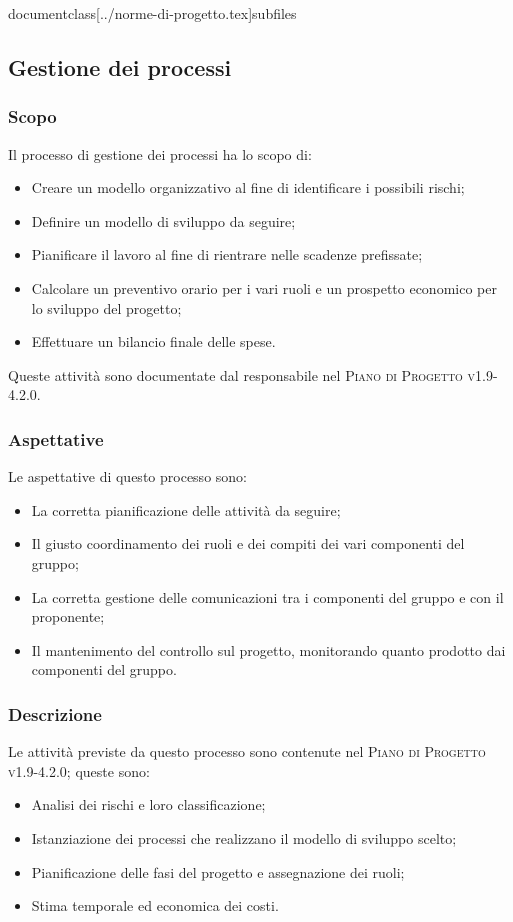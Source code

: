documentclass[../norme-di-progetto.tex]{subfiles}


\subsection{Gestione dei processi}
\subsubsection{Scopo}
Il processo di gestione dei processi ha lo scopo di:
\begin{itemize}
  \item Creare un modello organizzativo al fine di identificare i possibili rischi;
  \item Definire un modello di sviluppo da seguire;
  \item Pianificare il lavoro al fine di rientrare nelle scadenze prefissate;
  \item Calcolare un preventivo orario per i vari ruoli e un prospetto economico per lo sviluppo del progetto;
  \item Effettuare un bilancio finale delle spese.
\end{itemize}
Queste attività sono documentate dal responsabile nel \textsc{Piano di Progetto v1.9-4.2.0}.

\subsubsection{Aspettative}
Le aspettative di questo processo sono:
\begin{itemize}
  \item La corretta pianificazione delle attività da seguire;
  \item Il giusto coordinamento dei ruoli e dei compiti dei vari componenti del gruppo;
  \item La corretta gestione delle comunicazioni tra i componenti del gruppo e con il proponente;
  \item Il mantenimento del controllo sul progetto, monitorando quanto prodotto dai componenti del gruppo.
\end{itemize}

\subsubsection{Descrizione}
Le attività previste da questo processo sono contenute nel \textsc{Piano di Progetto v1.9-4.2.0}; queste sono:
\begin{itemize}
  \item Analisi dei rischi e loro classificazione;
  \item Istanziazione dei processi che realizzano il modello di sviluppo scelto;
  \item Pianificazione delle fasi del progetto e assegnazione dei ruoli;
  \item Stima temporale ed economica dei costi.
\end{itemize}

